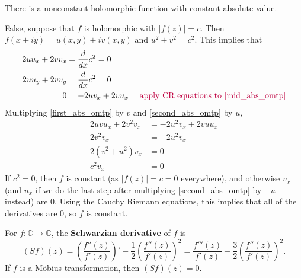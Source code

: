 \documentclass{homework}
\begin{document}
\begin{problem}\label{open-mapping-theorem-preview}
There is a nonconstant holomorphic function with constant absolute value.
\end{problem}
\begin{solution}
False, suppose that $f$ is holomorphic with $|f(z)| = c$. Then $f(x+iy) = u(x, y) + iv(x, y)$ and $u^2 + v^2 = c^2.$ This implies that 
\begin{align}
\label{first_abs_omtp} 2uu_x + 2vv_x &= \frac{d}{dx}c^2 = 0\\
\label{mid_abs_omtp}2uu_y + 2vv_y &= \frac{d}{dx}c^2 = 0\\
\label{second_abs_omtp} 0 &= -2uv_x + 2vu_x \color{purple} \quad\text{ apply CR equations to \ref{mid_abs_omtp}}
\end{align}
Multiplying \ref{first_abs_omtp} by $v$ and \ref{second_abs_omtp} by $u$,
\begin{align*}
2uvu_x + 2v^2v_x &= -2u^2v_x + 2vuu_x\\
2v^2v_x &= -2u^2v_x\\
2(v^2 +u^2) v_x &= 0\\
c^2v_x &= 0
\end{align*}
If $c^2=0$, then $f$ is constant (as $|f(z)|=c=0$ everywhere), and otherwise $v_x$ (and $u_x$ if we do the last step after multiplying \ref{second_abs_omtp} by $-u$ instead) are 0. Using the Cauchy Riemann equations, this implies that all of the derivatives are 0, so $f$ is constant.
\end{solution}
\begin{problem}\label{schwarzian-derivative}For $f : \mathbb{C} \to \mathbb{C}$, the \textbf{Schwarzian derivative} of $f$ is
  \[ (Sf)(z)=\left({\frac{f''(z)}{f'(z)}}\right)'-{\frac12}\left(\frac{f''(z)}{f'(z)}\right)^2={\frac {f'''(z)}{f'(z)}}-{\frac32}\left(\frac{f''(z)}{f'(z)}\right)^2. \]
  If $f$ is a M\"obius transformation, then $(Sf)(z) = 0$.
\end{problem}
\end{document}
